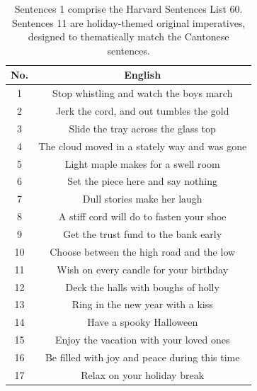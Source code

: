 \begin{table}[!htbp]
\begin{center}
  \footnotesize
\begin{tabular}{c c}
\toprule
\textbf{No.}  & \textbf{English} \\
 \midrule
1 & Stop whistling and watch the boys march \\ 
2 & Jerk the cord, and out tumbles the gold \\ 
3 & Slide the tray across the glass top \\ 
4 & The cloud moved in a stately way and was gone \\ 
5 & Light maple makes for a swell room \\ 
6 & Set the piece here and say nothing \\ 
7 & Dull stories make her laugh \\ 
8 & A stiff cord will do to fasten your shoe \\ 
9 & Get the trust fund to the bank early \\ 
10 & Choose between the high road and the low \\ 
11 & Wish on every candle for your birthday \\ 
12 & Deck the halls with boughs of holly \\ 
13 & Ring in the new year with a kiss \\ 
14 & Have a spooky Halloween \\ 
15 & Enjoy the vacation with your loved ones \\ 
16 & Be filled with joy and peace during this time \\ 
17 & Relax on your holiday break \\ 
\bottomrule

\end{tabular}
\caption{Sentences 1 comprise the Harvard Sentences List 60. Sentences 11 are holiday-themed original imperatives, designed to thematically match the Cantonese sentences.}
\label{ch2:tab:eng_sent}
\end{center}
\end{table}

